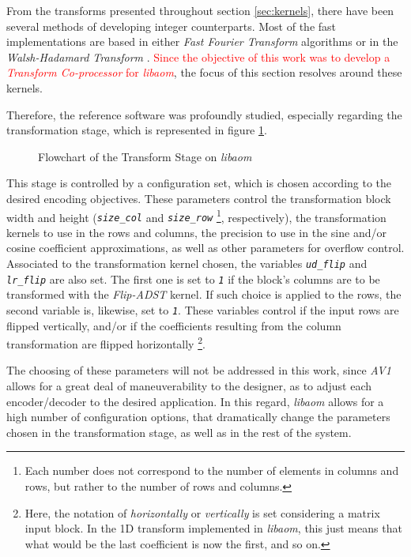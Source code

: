 From the transforms presented throughout section \ref{sec:kernels}, there have been several methods of developing integer counterparts. Most of the fast implementations are based in either \emph{Fast Fourier Transform} algorithms or in the \emph{Walsh-Hadamard Transform} \cite{wolterParallelArchitecturesDiscrete1992,yonghongzengIntegerDCTsFast2001}. \textcolor{red}{Since the objective of this work was to develop a \emph{Transform Co-processor} for \emph{libaom}}, the focus of this section resolves around these kernels. 

Therefore, the reference software was profoundly studied, especially regarding the transformation stage, which is represented in figure \ref{fig:libtrans}.

\begin{figure}[!htbp]
    \centering
    
    \caption{Flowchart of the Transform Stage on \emph{libaom}}
    \label{fig:libtrans}
\end{figure}

This stage is controlled by a configuration set, which is chosen according to the desired encoding objectives. These parameters control the transformation block width and height (\emph{\texttt{size\_col}} and \emph{\texttt{size\_row}} \footnote{Each number does not correspond to the number of elements in columns and rows, but rather to the number of rows and columns.}, respectively), the transformation kernels to use in the rows and columns, the precision to use in the sine and/or cosine coefficient approximations, as well as other parameters for overflow control. Associated to the transformation kernel chosen, the variables \emph{\texttt{ud\_flip}} and \emph{\texttt{lr\_flip}} are also set. The first one is set to \emph{\texttt{1}} if the block's columns are to be transformed with the \emph{Flip-ADST} kernel. If such choice is applied to the rows, the second variable is, likewise, set to \emph{\texttt{1}}. These variables control if the input rows are flipped vertically, and/or if the coefficients resulting from the column transformation are flipped horizontally \footnote{Here, the notation of \emph{horizontally} or \emph{vertically} is set considering a matrix input block. In the 1D transform implemented in \emph{libaom}, this just means that what would be the last coefficient is now the first, and so on.}.

The choosing of these parameters will not be addressed in this work, since \emph{AV1} allows for a great deal of maneuverability to the designer, as to adjust each encoder/decoder to the desired application. In this regard, \emph{libaom} allows for a high number of configuration options, that dramatically change the parameters chosen in the transformation stage, as well as in the rest of the system.


